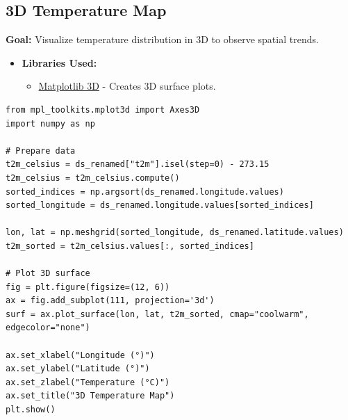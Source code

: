 \documentclass[a4paper,10pt]{article}
\begin{document}
\subsection{3D Temperature Map}
\textbf{Goal:} Visualize temperature distribution in 3D to observe spatial trends.

\begin{itemize}
    \item \textbf{Libraries Used:}
    \begin{itemize}
        \item \href{https://matplotlib.org/stable/tutorials/toolkits/mplot3d.html}{Matplotlib 3D} - Creates 3D surface plots.
    \end{itemize}
\end{itemize}

\begin{verbatim}
from mpl_toolkits.mplot3d import Axes3D
import numpy as np

# Prepare data
t2m_celsius = ds_renamed["t2m"].isel(step=0) - 273.15
t2m_celsius = t2m_celsius.compute()
sorted_indices = np.argsort(ds_renamed.longitude.values)
sorted_longitude = ds_renamed.longitude.values[sorted_indices]

lon, lat = np.meshgrid(sorted_longitude, ds_renamed.latitude.values)
t2m_sorted = t2m_celsius.values[:, sorted_indices]

# Plot 3D surface
fig = plt.figure(figsize=(12, 6))
ax = fig.add_subplot(111, projection='3d')
surf = ax.plot_surface(lon, lat, t2m_sorted, cmap="coolwarm", edgecolor="none")

ax.set_xlabel("Longitude (°)")
ax.set_ylabel("Latitude (°)")
ax.set_zlabel("Temperature (°C)")
ax.set_title("3D Temperature Map")
plt.show()
\end{verbatim}
\end{document}
